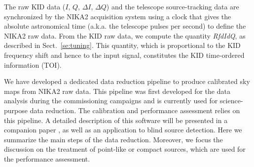 

The raw KID data ($I$, $Q$, $\Delta I$, $\Delta Q$) and the telescope
source-tracking data are synchronized by the NIKA2 acquisition system using a
clock that gives the absolute astronomical time (a.k.a. the telescope
pulses per second) to define the NIKA2 raw data. From the KID raw
data, we compute the quantity \emph{RfdIdQ}, as described in
Sect.~\ref{se:tuning}. This quantity, which is proportional to the KID
frequency shift and hence to the input signal, constitutes the
KID time-ordered information (TOI).


We have developed a dedicated data reduction pipeline to
produce calibrated sky maps from NIKA2 raw data. This pipeline was first 
developed for the data analysis during the commissioning campaigns and
is currently used for science-purpose data reduction. The calibration
and performance assessment relies on this pipeline. 
A detailed description of this software will be presented in a companion
paper \citep{Ponthieu2019}, as well as an application to blind source
detection. Here we summarize the main steps of the data
reduction. {\lp Moreover, we focus the discussion on the treatment of
point-like or compact sources, which are used for the
performance assessment.}

